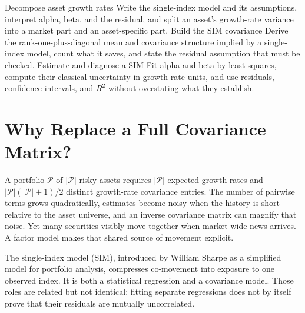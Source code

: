 \documentclass[11pt]{article}
\newcommand{\np}{|\mathcal P|}
\begin{document}

\learningobjectives
  {Decompose asset growth rates}
  {Write the single-index model and its assumptions, interpret alpha, beta, and the residual, and split an asset's growth-rate variance into a market part and an asset-specific part.}
  {Build the SIM covariance}
  {Derive the rank-one-plus-diagonal mean and covariance structure implied by a single-index model, count what it saves, and state the residual assumption that must be checked.}
  {Estimate and diagnose a SIM}
  {Fit alpha and beta by least squares, compute their classical uncertainty in growth-rate units, and use residuals, confidence intervals, and $R^2$ without overstating what they establish.}

\section{Why Replace a Full Covariance Matrix?}

A portfolio $\mathcal P$ of $\np$ risky assets requires $\np$ expected growth rates and $\np(\np+1)/2$ distinct growth-rate covariance entries. The number of pairwise terms grows quadratically, estimates become noisy when the history is short relative to the asset universe, and an inverse covariance matrix can magnify that noise. Yet many securities visibly move together when market-wide news arrives. A factor model makes that shared source of movement explicit.

The single-index model (SIM), introduced by William Sharpe as a simplified model for portfolio analysis, compresses co-movement into exposure to one observed index. It is both a statistical regression and a covariance model. Those roles are related but not identical: fitting separate regressions does not by itself prove that their residuals are mutually uncorrelated.
\end{document}
